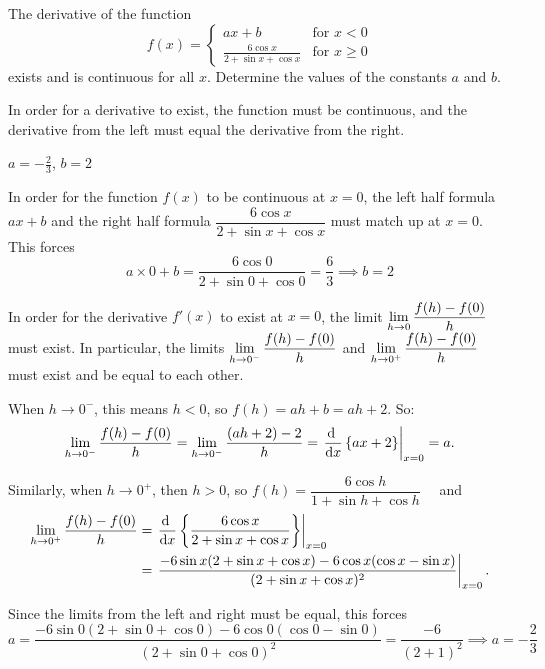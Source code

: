 \begin{question}[1997A]
 The derivative of the function
\[
f(x)=\left\{\begin{array}{ll}
ax+b& \mbox{for }x<0\\
            \frac{6\cos x}{2+\sin x+\cos x}& \mbox{for }x\ge 0
\end{array}\right.
\]
exists and is continuous for all $x$. Determine the values of the constants
$a$ and $b$.
\end{question}
\begin{hint} In order for a derivative to exist, the function must be continuous, and the derivative from the left must equal the derivative from the right.
\end{hint}
\begin{answer} $a=-\frac{2}{3}$, $b=2$
\end{answer}
\begin{solution}  In order for the function $f(x)$ to be continuous at $x=0$,
the left half formula $ax+b$ and the right half formula
$\dfrac{6\cos x}{2+\sin x+\cos x}$ must match up at $x=0$. This
forces
$$
a\times 0+b=\frac{6\cos 0}{2+\sin 0+\cos 0}=\frac{6}{3}
\implies \boxed{b=2}
$$

In order for the derivative $f'(x)$ to exist at $x=0$,
the limit $\displaystyle\lim_{h \rightarrow 0} \dfrac{f(h)-f(0)}{h}$ must exist. In particular,
the limits $\displaystyle\lim_{h \rightarrow 0^-} \dfrac{f(h)-f(0)}{h}$
and
$\displaystyle\lim_{h \rightarrow 0^+} \dfrac{f(h)-f(0)}{h}$ must exist and be equal to each other.

When $h \to 0^-$, this means $h<0$, so $f(h)=ah+b=ah+2$. So:
\[\ds\lim_{h\to 0^-}\dfrac{f(h)-f(0)}{h}=\ds\lim_{h\to 0^-}\dfrac{(ah+2)-2}{h}=\left.\ds\diff{}{x}\left\{ax+2\right\}\right|_{x=0}=a.\]

Similarly, when $h \to 0^+$, then $h>0$, so $f(h)=\dfrac{6\cos h}{1+\sin h + \cos h}$ ~~and \begin{align*}
\ds\lim_{h \rightarrow 0^+} \dfrac{f(h)-f(0)}{h} &= \left.\ds\diff{}{x}\left\{\dfrac{6\cos x}{2+\sin x + \cos x}\right\}\right|_{x=0}
\\&=\left.\frac{-6\sin x(2+\sin x+\cos x)-6\cos x(\cos x-\sin x)}{(2+\sin x+\cos x)^2}\right|_{x=0}.\end{align*}

Since the limits from the left and right must be equal, this forces
$$
a=\frac{-6\sin 0(2+\sin 0+\cos 0)-6\cos 0(\cos 0-\sin 0)}{(2+\sin 0+\cos 0)^2}
=\frac{-6}{(2+1)^2}\implies\boxed{a=-\frac{2}{3}}
$$
\end{solution}


